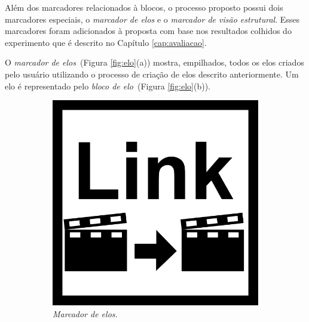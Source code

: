 \documentclass[../main.tex]{subfiles}
\begin{document}
Além dos marcadores relacionados à blocos, o processo proposto possui dois marcadores especiais, o \emph{marcador de elos} e o \emph{marcador de visão estrutural}. Esses marcadores foram adicionados à proposta com base nos resultados colhidos do experimento que é descrito no Capítulo \ref{cap:avaliacao}.

O \emph{marcador de elos}~(Figura \ref{fig:elo}(a)) mostra, empilhados, todos os elos criados pelo usuário utilizando o processo de criação de elos descrito anteriormente. Um elo é representado pelo \emph{bloco de elo}~(Figura \ref{fig:elo}(b)). 

\begin{figure}[!h]
\centering
  \begin{subfigure}{0.3\linewidth}
  \centering
  \label{subfig:elo_marker}
    \includegraphics[width=1\linewidth]{IMG/Marcadores/link.png}
    \caption{\textit{Marcador de elos.}}
  \end{subfigure}
  \begin{subfigure}{0.3\linewidth}
  \centering
  \label{subfig:elo_bloco}

\end{subfigure}
\end{figure}
\end{document}
